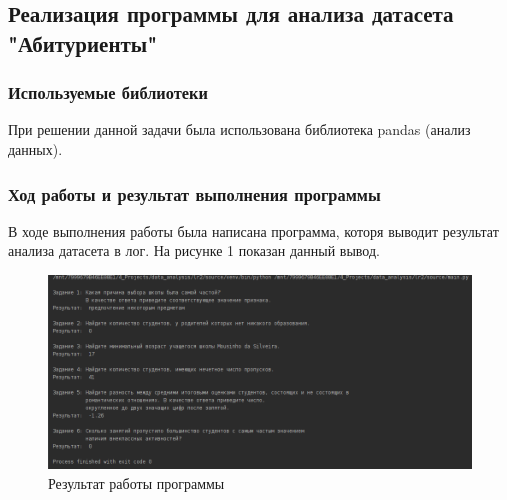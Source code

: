\documentclass[a4paper]{article}
\begin{document}
\subsection{Реализация программы для анализа датасета "Абитуриенты"}
\subsubsection{Используемые библиотеки}
\normalsize{
    При решении данной задачи была использована библиотека pandas (анализ данных).
}
\subsubsection{Ход работы и результат выполнения программы}
\normalsize{
    В ходе выполнения работы была написана программа, которя выводит результат анализа датасета в лог. На рисунке 1 показан данный вывод.
    
    \begin{figure}[h]
        \centering
        \graphicspath{{./}}
        \includegraphics[scale=0.65]{programm_result.png}
        \caption{Результат работы программы}
    \end{figure} 
}
\end{document}
